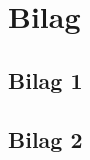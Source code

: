 \documentclass[class=report, crop=false]{standalone}
\begin{document}
    \chapter{Bilag}
    \section{Bilag 1}
    \lipsum[2-4]
    \section{Bilag 2}
    \lipsum[2-4]
\end{document}
